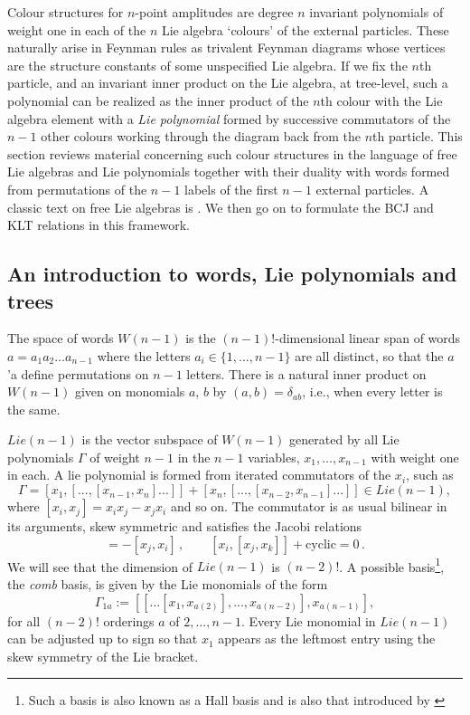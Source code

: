 \documentclass[11pt]{article}
\newcommand{\1}{{\rm 1\hskip-0.25em I}}
\begin{document}
Colour structures for $n$-point  amplitudes are degree $n$ invariant polynomials of weight one in each of the $n$ Lie algebra `colours' of the external particles.  These  naturally arise in Feynman rules as trivalent Feynman diagrams whose vertices are the structure constants of some unspecified Lie algebra.  If we fix the $n$th particle, and an invariant inner product on the Lie algebra, at tree-level, such a polynomial can be realized as the inner product of the $n$th colour with the Lie algebra element with a \emph{Lie polynomial} formed by successive commutators of the $n-1$ other colours working through the diagram back from the $n$th particle. This section reviews material concerning such colour structures in the language of free Lie algebras and Lie polynomials  together with their duality with words formed from permutations of the $n-1$ labels of the first $n-1$ external particles. A classic text on free Lie algebras is \cite{Reutenauer}. We then go on to formulate the BCJ and KLT relations in this framework.

\subsection{An introduction to words, Lie polynomials and trees}

The space of words $W(n-1)$ is the $(n-1)!$-dimensional linear span of  words $a=a_1a_2\ldots a_{n-1}$ where the letters $a_i\in \{1,\ldots,n-1\}$ are all distinct, so that the $a$'a define permutations on $n-1$ letters.  There is a natural inner product on $W(n-1)$ given  on monomials $a$, $b$ by $(a,b)=\delta_{ab}$, i.e., when every letter is the same. 



$Lie(n-1)$ is the vector subspace of $W(n-1)$  generated by all Lie polynomials $\Gamma$ of weight $n-1$ in the $n-1$ variables, $x_1, ... , x_{n-1}$ with weight one in each.  A lie polynomial is formed from iterated commutators of the $x_i$, such as
$$
\Gamma=[x_1,[...,[x_{n-1},x_n]...]] + [x_n,[...,[x_{n-2},x_{n-1}]...]] \in Lie(n-1),
$$
where $[x_i,x_j]=x_ix_j-x_jx_i$ and so on.
 The commutator  is as usual bilinear in its arguments, skew symmetric and satisfies the Jacobi relations
\begin{equation}
[x_i,x_j]=-[x_j,x_i]\, , \qquad [x_i,[x_j,x_k]]+ \mbox {cyclic}=0\, .
\end{equation}
We will see that the dimension of $Lie(n-1)$ is $(n-2)!$.  A possible basis\footnote{Such a basis is also known as a Hall basis \cite{Hall:1950} and is also that introduced by \cite{DelDuca:1999rs}}, the \emph{comb} basis, is given by the Lie monomials of the form
\begin{equation}
\Gamma_{1a}:=[[\ldots [x_{1},x_{a(2)}],...,x_{a(n-2)}],x_{a(n-1)}], \label{comb}
\end{equation}
for all $(n-2)!$ orderings $a$ of $2,\ldots,n-1$. Every Lie monomial in $Lie(n-1)$ can be adjusted up to sign so that $x_1$ appears as the leftmost entry using the skew symmetry of the Lie bracket.
\end{document}

